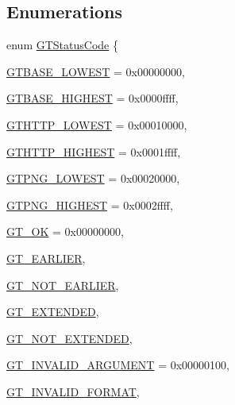 \subsection*{Enumerations}
\begin{DoxyCompactItemize}
\item 
enum \hyperlink{group__common_ga43b0c0f44bcf02caf0c2866b1f647a35}{GTStatusCode} \{ \par
\hyperlink{group__common_gga43b0c0f44bcf02caf0c2866b1f647a35af146251f9857673f1f5dac74ae9fc33d}{GTBASE\_\-LOWEST} =  0x00000000, 
\par
\hyperlink{group__common_gga43b0c0f44bcf02caf0c2866b1f647a35ad069ecd772334533f3fffeb36ff56883}{GTBASE\_\-HIGHEST} =  0x0000ffff, 
\par
\hyperlink{group__common_gga43b0c0f44bcf02caf0c2866b1f647a35a482dd722dd3a434c49cf697238afece1}{GTHTTP\_\-LOWEST} =  0x00010000, 
\par
\hyperlink{group__common_gga43b0c0f44bcf02caf0c2866b1f647a35ac72fe66798a566f300fdd86e060fd856}{GTHTTP\_\-HIGHEST} =  0x0001ffff, 
\par
\hyperlink{group__common_gga43b0c0f44bcf02caf0c2866b1f647a35aa6c867b2e8a5c68beb3200d2f71b5c14}{GTPNG\_\-LOWEST} =  0x00020000, 
\par
\hyperlink{group__common_gga43b0c0f44bcf02caf0c2866b1f647a35af97a98f04945f529eb41bb2194dc14ca}{GTPNG\_\-HIGHEST} =  0x0002ffff, 
\par
\hyperlink{group__common_gga43b0c0f44bcf02caf0c2866b1f647a35a996c7fc00d2a9bf08b5ba39bb9d58be9}{GT\_\-OK} =  0x00000000, 
\par
\hyperlink{group__common_gga43b0c0f44bcf02caf0c2866b1f647a35a5cbd9721ecf4a6ba9bb59bbe25b1c8f2}{GT\_\-EARLIER}, 
\par
\hyperlink{group__common_gga43b0c0f44bcf02caf0c2866b1f647a35aa3219ad05a105f80de2f5c6611ba5304}{GT\_\-NOT\_\-EARLIER}, 
\par
\hyperlink{group__common_gga43b0c0f44bcf02caf0c2866b1f647a35a264552b4501a19232e314f9918d286b0}{GT\_\-EXTENDED}, 
\par
\hyperlink{group__common_gga43b0c0f44bcf02caf0c2866b1f647a35ac12e472467ea8c6713ece545fbcd2299}{GT\_\-NOT\_\-EXTENDED}, 
\par
\hyperlink{group__common_gga43b0c0f44bcf02caf0c2866b1f647a35a5f889055677c0eb6fdda08ef7557d05d}{GT\_\-INVALID\_\-ARGUMENT} =  0x00000100, 
\par
\hyperlink{group__common_gga43b0c0f44bcf02caf0c2866b1f647a35a4fcba6e4b980a9ab05d426f99360e1ed}{GT\_\-INVALID\_\-FORMAT}, 
\par

\end{DoxyCompactItemize}
